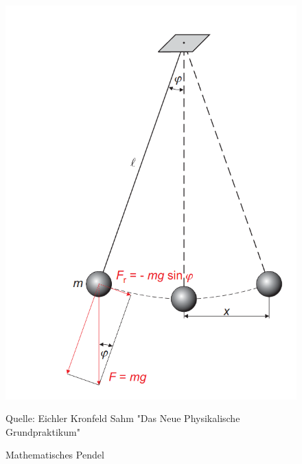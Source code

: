 \begin{figure}[ht]
    \centering
    \includegraphics[scale=0.3]{Pendel/Protokoll/fig/Mathematisches Pendel.png}
    \caption{Mathematisches Pendel}
    \label{fig:Mathematisches Pendel}
    Quelle: Eichler Kronfeld Sahm "Das Neue Physikalische Grundpraktikum"
\end{figure}

